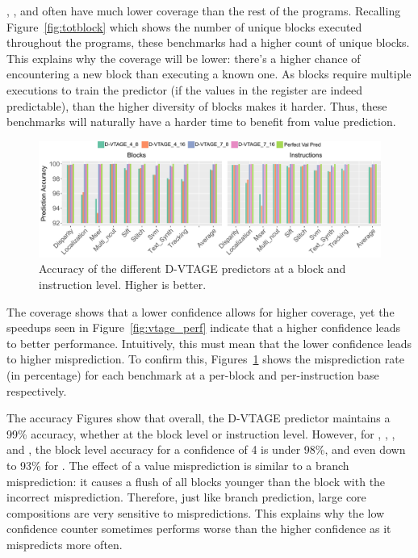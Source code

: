, ,  and  often have much lower coverage than the rest of the programs.
Recalling Figure~\ref{fig:totblock} which shows the number of unique blocks executed throughout the programs, these benchmarks had a higher count of unique blocks.
This explains why the coverage will be lower: there's a higher chance of encountering a new block than executing a known one.
As blocks require multiple executions to train the predictor (if the values in the register are indeed predictable), than the higher diversity of blocks makes it harder.
Thus, these benchmarks will naturally have a harder time to benefit from value prediction.


\begin{figure}[t]
    \centering
    \includegraphics[width=1\textwidth]{chapter3/graphics/predAcc.pdf}
    \caption{Accuracy of the different D-VTAGE predictors at a block and instruction level. Higher is better.}
    \label{fig:vtag_accuracy_block}
	\vspace{1em}
\end{figure}

The coverage shows that a lower confidence allows for higher coverage, yet the speedups seen in Figure~\ref{fig:vtage_perf} indicate that a higher confidence leads to better performance.
Intuitively, this must mean that the lower confidence leads to higher misprediction.
To confirm this, Figures~\ref{fig:vtag_accuracy_block} shows the misprediction rate (in percentage) for each benchmark at a per-block and per-instruction base respectively.

The accuracy Figures show that overall, the D-VTAGE predictor maintains a 99\% accuracy, whether at the block level or instruction level.
However, for , , ,  and , the block level accuracy for a confidence of 4 is under 98\%, and even down to 93\% for .
The effect of a value misprediction is similar to a branch misprediction: it causes a flush of all blocks younger than the block with the incorrect misprediction.
Therefore, just like branch prediction, large core compositions are very sensitive to mispredictions.
This explains why the low confidence counter sometimes performs worse than the higher confidence as it mispredicts more often.

